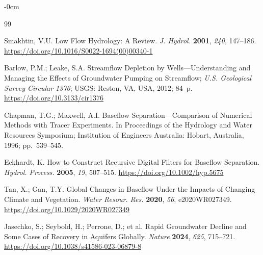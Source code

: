 \documentclass[hydrology,article,submit,pdftex,moreauthors]{Definitions/mdpi}
\begin{document}




\begin{adjustwidth}{-\extralength}{0cm}


\begin{thebibliography}{99}

Smakhtin, V.U. Low Flow Hydrology: A Review. \textit{J. Hydrol.} \textbf{2001}, \textit{240}, 147--186. \url{https://doi.org/10.1016/S0022-1694(00)00340-1}

Barlow, P.M.; Leake, S.A. Streamflow Depletion by Wells---Understanding and Managing the Effects of Groundwater Pumping on Streamflow; \textit{U.S. Geological Survey Circular 1376}; USGS: Reston, VA, USA, 2012; 84~p. \url{https://doi.org/10.3133/cir1376}

Chapman, T.G.; Maxwell, A.I. Baseflow Separation---Comparison of Numerical Methods with Tracer Experiments. In Proceedings of the Hydrology and Water Resources Symposium; Institution of Engineers Australia: Hobart, Australia, 1996; pp.~539--545.

Eckhardt, K. How to Construct Recursive Digital Filters for Baseflow Separation. \textit{Hydrol. Process.} \textbf{2005}, \textit{19}, 507--515. \url{https://doi.org/10.1002/hyp.5675}

Tan, X.; Gan, T.Y. Global Changes in Baseflow Under the Impacts of Changing Climate and Vegetation. \textit{Water Resour. Res.} \textbf{2020}, \textit{56}, e2020WR027349. \url{https://doi.org/10.1029/2020WR027349}

Jasechko, S.; Seybold, H.; Perrone, D.; et al. Rapid Groundwater Decline and Some Cases of Recovery in Aquifers Globally. \textit{Nature} \textbf{2024}, \textit{625}, 715--721. \url{https://doi.org/10.1038/s41586-023-06879-8}


\end{thebibliography}
\end{adjustwidth}
\end{document}
